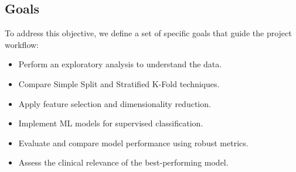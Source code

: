 \subsection{Goals}

To address this objective, we define a set of specific goals that guide the
project workflow:

\begin{itemize}[label=]
	\item Perform an exploratory analysis to understand the data.
	\item Compare Simple Split and Stratified K-Fold techniques.
	\item Apply feature selection and dimensionality reduction.
	\item Implement ML models for supervised classification.
	\item Evaluate and compare model performance using robust metrics.
	\item Assess the clinical relevance of the best-performing model.
\end{itemize}
